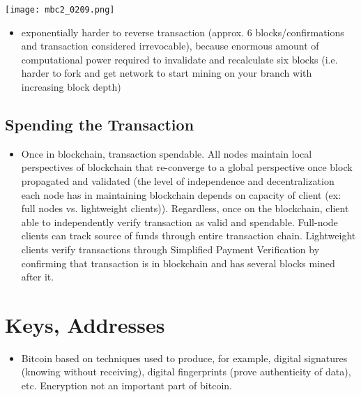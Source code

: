 \documentclass[english, 11pt]{article}
\begin{document}
\begin{tcolorbox}
\begin{minipage}{0.2\linewidth}
    \texttt{[image: mbc2\_0209.png]}
\end{minipage}\hfil
\begin{minipage}{0.5\linewidth}
\begin{itemize}
    \item exponentially harder to reverse transaction (approx. 6 blocks/confirmations and transaction considered irrevocable), because enormous amount of computational power required to invalidate and recalculate six blocks (i.e. harder to fork and get network to start mining on your branch with increasing block depth)
\end{itemize}
\end{minipage}
\end{tcolorbox}

\subsection{Spending the Transaction}
\begin{itemize}
    \item Once in blockchain, transaction spendable. All nodes maintain local perspectives of blockchain that re-converge to a global perspective once block propagated and validated (the level of independence and decentralization each node has in maintaining blockchain depends on capacity of client (ex: full nodes vs. lightweight clients)). Regardless, once on the blockchain, client able to independently verify transaction as valid and spendable. Full-node clients can track source of funds through entire transaction chain. Lightweight clients verify transactions through Simplified Payment Verification by confirming that transaction is in blockchain and has several blocks mined after it.
\end{itemize}
\clearpage




\section{Keys, Addresses}
\begin{itemize}
    \item Bitcoin based on  techniques used to produce, for example, digital signatures (knowing without receiving), digital fingerprints (prove authenticity of data), etc. Encryption not an important part of bitcoin.
\end{itemize}
\end{document}
